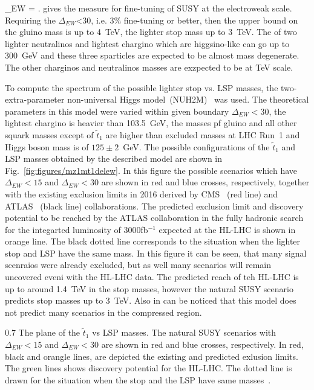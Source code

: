 {
\Delta_{EW} = .
}
gives the measure for fine-tuning of SUSY at the electroweak scale. Requiring the $\Delta_{EW}$<30, i.e. 3\% fine-tuning or better, then the upper bound on the gluino mass is up to 4~TeV, the lighter stop mass up to 3~TeV. The of two lighter neutralinos and lightest chargino which are higgsino-like can go up to 300~GeV and these three sparticles are expected to be almost mass degenerate. The other charginos and neutralinos masses are exzpected to be at TeV scale.


To compute the spectrum of the possible lighter stop vs. LSP masses, the two-extra-parameter non-universal Higgs model~(NUH2M)~\cite{Matalliotakis:1994ft, Nath:1997qm, Ellis:2002iu, Baer:2005bu} was used. The theoretical parameters in this model were varied within given boundary $\Delta_{EW} <30$, the lightest chargino is heavier than 103.5~GeV, the masses pf gluino and all other squark masses except of $\tilde{t}_{1}$ are higher than excluded masses at LHC Run~1 and Higgs boson mass is of $125 \pm 2$~GeV. The possible configurations of the $\tilde{t}_{1}$ and LSP masses obtained by the described model are shown in Fig.~\ref{fig:figures/mz1mt1delew}. In this figure the possible scenarios which have $\Delta_{EW} <15$ and $\Delta_{EW} <30$ are shown in red and blue crosses, respectively, together with the existing exclusion limits in 2016 derived by CMS~\cite{CMS:2016hxa} (red line) and ATLAS~\cite{ATLAS:2016jaa, ATLAS:2016ljb, ATLAS:2016xcm, Aaboud:2016tnv} (black line) collaborations. The predicted exclusion limit and discovery potential to be reached by the ATLAS collaboration in the fully hadronic search for the integarted luminosity of $3000$fb$^{-1}$ expected at the HL-LHC is shown in orange line. The black dotted line corresponds to the situation when the lighter stop and LSP have the same mass. In this figure it can be seen, that many signal scenraios were already excluded, but as well many scenarios will remain uncovered eveni with the HL-LHC data. The predicted reach of teh HL-LHC is up to around 1.4~TeV in the stop masses, however the natural SUSY scenario predicts stop masses up to 3~TeV. Also in can be noticed that this model does not predict many scenarios in the compressed region.  

                 {0.7}       %
                 { The plane of the $\tilde{t}_{1}$ vs LSP masses. The natural SUSY scenarios with $\Delta_{EW} <15$ and $\Delta_{EW} <30$ are shown in red and blue crosses, respectively. In red, black and orangle lines, are depicted the existing and predicted exlusion limits. The green lines shows discovery potential for the HL-LHC. The dotted line is drawn for the situation when the stop and the LSP have same masses~\cite{Baer:2016bwh}.   }

